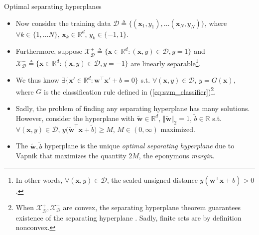\documentclass{beamer}
\numberwithin{equation}{section}
\newcommand{\aref}[1]{\alert{\ref{#1}}}
\begin{document}
\begin{frame}{Optimal separating hyperplanes}
    \begin{itemize}
        \item
        Now consider the training data $ \mathcal{D} \triangleq
        \{(\mathbf{x}_1, y_1), \ldots (\mathbf{x}_N, y_N)\} $, where $ \forall
        k \in \{1, \ldots N\} $, $ \mathbf{x}_k \in \mathbb{R}^d $,
        $ y_k \in \{-1, 1\} $.

        \item        
        Furthermore, suppose $ \mathcal{X}_\mathcal{D}^+ \triangleq
        \{\mathbf{x} \in \mathbb{R}^d : (\mathbf{x}, y) \in \mathcal{D},
        y = 1\} $ and $ \mathcal{X}_\mathcal{D}^- \triangleq
        \{\mathbf{x} \in \mathbb{R}^d : (\mathbf{x}, y) \in \mathcal{D},
        y = -1\} $ are linearly separable\footnote{
            In other words, $ \forall (\mathbf{x}, y) \in \mathcal{D} $,
            the scaled unsigned distance
            $ y(\mathbf{w}^\top\mathbf{x} + b) > 0 $.
        }.

        \item
        We thus know $ \exists \{\mathbf{x}' \in \mathbb{R}^d :
        \mathbf{w}^\top\mathbf{x}' + b = 0\} $ s.t. $ \forall (\mathbf{x}, y)
        \in \mathcal{D} $, $ y = G(\mathbf{x}) $, where $ G $ is the
        classification rule defined in (\aref{eq:svm_classifier})\footnote{
            When $ \mathcal{X}_\mathcal{D}^+, \mathcal{X}_\mathcal{D}^- $ are
            convex, the separating hyperplane theorem guarantees existence
            of the separating hyperplane \cite{bv_convex_opt}. Sadly,
            finite sets are by definition nonconvex.
        }.

        \item
        Sadly, the problem of finding \alert{any} separating hyperplane has
        many solutions. However, consider the hyperplane with
        $ \tilde{\mathbf{w}} \in \mathbb{R}^d $,
        $ \Vert\tilde{\mathbf{w}}\Vert_2 = 1 $, $ \tilde{b} \in \mathbb{R} $
        s.t. $ \forall (\mathbf{x}, y) \in \mathcal{D} $,
        $ y\big(\tilde{\mathbf{w}}^\top\mathbf{x} + \tilde{b}\big) \ge M $,
        $ M \in (0, \infty) $ maximized.

        \item
        The $ \tilde{\mathbf{w}}, \tilde{b} $ hyperplane is the \alert{unique}
        \textit{optimal separating hyperplane} due to Vapnik that maximizes
        the quantity $ 2M $, the eponymous \textit{margin}.
    \end{itemize}

    \medskip
\end{frame}
\end{document}
